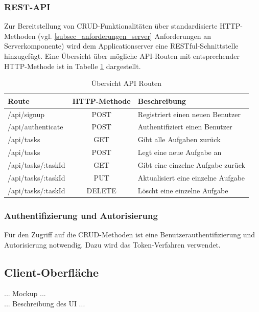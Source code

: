 \subsubsection{REST-API}

Zur Bereitstellung von CRUD-Funktionalitäten über standardisierte HTTP-Methoden (vgl. \ref{subsec_anforderungen_server} Anforderungen an Serverkomponente) wird dem Applicationserver eine RESTful-Schnittstelle hinzugefügt. Eine Übersicht über mögliche API-Routen mit entsprechender HTTP-Methode ist in Tabelle \ref{tbl_api-routes} dargestellt. \\

\begin{table}[h]
\centering
\begin{tabular}{l | c | l }
    \textbf{Route} & \textbf{HTTP-Methode} & \textbf{Beschreibung} \\
    \hline\hline
    /api/signup & POST & Registriert einen neuen Benutzer \\
    /api/authenticate & POST & Authentifiziert einen Benutzer \\
    \hline
    /api/tasks & GET & Gibt alle Aufgaben zurück \\
    /api/tasks & POST & Legt eine neue Aufgabe an \\
    /api/tasks/:taskId & GET & Gibt eine einzelne Aufgabe zurück \\
    /api/tasks/:taskId & PUT & Aktualisiert eine einzelne Aufgabe \\
    /api/tasks/:taskId & DELETE & Löscht eine einzelne Aufgabe \\
\end{tabular}
\caption{Übersicht API Routen}
\label{tbl_api-routes}
\end{table}

\subsubsection{Authentifizierung und Autorisierung} 

Für den Zugriff auf die CRUD-Methoden ist eine Benutzerauthentifizierung und Autorisierung notwendig. Dazu wird das Token-Verfahren verwendet.

\subsection{Client-Oberfläche}
\label{subsec_konzeption_client-ui}


... Mockup ... \\
... Beschreibung des UI ...\\

